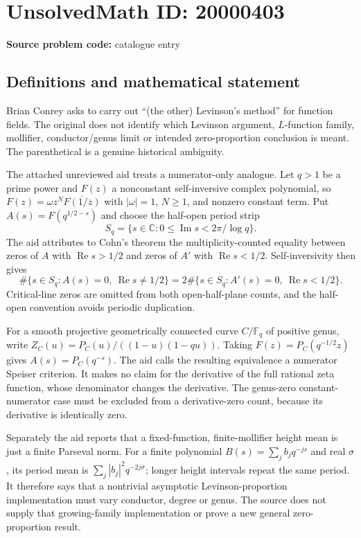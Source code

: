 \documentclass[11pt]{article}
\newcommand{\C}{\mathbb{C}}
\newcommand{\F}{\mathbb{F}}
\begin{document}
\section*{UnsolvedMath ID: 20000403}
\textbf{Source problem code:} catalogue entry
\subsection{Definitions and mathematical statement}
Brian Conrey asks to carry out ``(the other) Levinson's method'' for function fields. The original does not identify which Levinson argument, $L$-function family, mollifier, conductor/genus limit or intended zero-proportion conclusion is meant. The parenthetical is a genuine historical ambiguity.

The attached unreviewed aid treats a numerator-only analogue. Let $q>1$ be a prime power and $F(z)$ a nonconstant self-inversive complex polynomial, so $F(z)=\omega z^N\overline{F(1/\overline z)}$ with $|\omega|=1$, $N\ge1$, and nonzero constant term. Put $A(s)=F(q^{1/2-s})$ and choose the half-open period strip
\[
S_q=\{s\in\C:0\le\operatorname{Im}s<2\pi/\log q\}.
\]
The aid attributes to Cohn's theorem the multiplicity-counted equality between zeros of $A$ with $\operatorname{Re}s>1/2$ and zeros of $A'$ with $\operatorname{Re}s<1/2$. Self-inversivity then gives
\[
\#\{s\in S_q:A(s)=0,\ \operatorname{Re}s\ne1/2\}
=2\#\{s\in S_q:A'(s)=0,\ \operatorname{Re}s<1/2\}.
\]
Critical-line zeros are omitted from both open-half-plane counts, and the half-open convention avoids periodic duplication.

For a smooth projective geometrically connected curve $C/\F_q$ of positive genus, write $Z_C(u)=P_C(u)/((1-u)(1-qu))$. Taking $F(z)=P_C(q^{-1/2}z)$ gives $A(s)=P_C(q^{-s})$. The aid calls the resulting equivalence a numerator Speiser criterion. It makes no claim for the derivative of the full rational zeta function, whose denominator changes the derivative. The genus-zero constant-numerator case must be excluded from a derivative-zero count, because its derivative is identically zero.

Separately the aid reports that a fixed-function, finite-mollifier height mean is just a finite Parseval norm. For a finite polynomial $B(s)=\sum_j b_jq^{-js}$ and real $\sigma$, its period mean is $\sum_j|b_j|^2q^{-2j\sigma}$; longer height intervals repeat the same period. It therefore says that a nontrivial asymptotic Levinson-proportion implementation must vary conductor, degree or genus. The source does not supply that growing-family implementation or prove a new general zero-proportion result.
\end{document}
